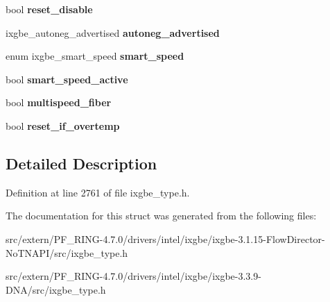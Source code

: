 \begin{DoxyCompactItemize}
\item 
\hypertarget{structixgbe__phy__info_aebeeb7db92070ce482c91002a32130bb}{
bool {\bfseries reset\_\-disable}}
\label{structixgbe__phy__info_aebeeb7db92070ce482c91002a32130bb}

\item 
\hypertarget{structixgbe__phy__info_a68aadb676c1bb75ae842e7dd1feb88be}{
ixgbe\_\-autoneg\_\-advertised {\bfseries autoneg\_\-advertised}}
\label{structixgbe__phy__info_a68aadb676c1bb75ae842e7dd1feb88be}

\item 
\hypertarget{structixgbe__phy__info_ade8aa97f797cd69da1011cc44bc572d7}{
enum ixgbe\_\-smart\_\-speed {\bfseries smart\_\-speed}}
\label{structixgbe__phy__info_ade8aa97f797cd69da1011cc44bc572d7}

\item 
\hypertarget{structixgbe__phy__info_a6b3182e879b3acdb82d70ac9244c92ff}{
bool {\bfseries smart\_\-speed\_\-active}}
\label{structixgbe__phy__info_a6b3182e879b3acdb82d70ac9244c92ff}

\item 
\hypertarget{structixgbe__phy__info_a692697d715596430af9221001ed8b3b1}{
bool {\bfseries multispeed\_\-fiber}}
\label{structixgbe__phy__info_a692697d715596430af9221001ed8b3b1}

\item 
\hypertarget{structixgbe__phy__info_a23bd9121d745d5db49ec24e634d85a53}{
bool {\bfseries reset\_\-if\_\-overtemp}}
\label{structixgbe__phy__info_a23bd9121d745d5db49ec24e634d85a53}

\end{DoxyCompactItemize}


\subsection{Detailed Description}


Definition at line 2761 of file ixgbe\_\-type.h.



The documentation for this struct was generated from the following files:\begin{DoxyCompactItemize}
\item 
src/extern/PF\_\-RING-\/4.7.0/drivers/intel/ixgbe/ixgbe-\/3.1.15-\/FlowDirector-\/NoTNAPI/src/ixgbe\_\-type.h\item 
src/extern/PF\_\-RING-\/4.7.0/drivers/intel/ixgbe/ixgbe-\/3.3.9-\/DNA/src/ixgbe\_\-type.h\end{DoxyCompactItemize}
